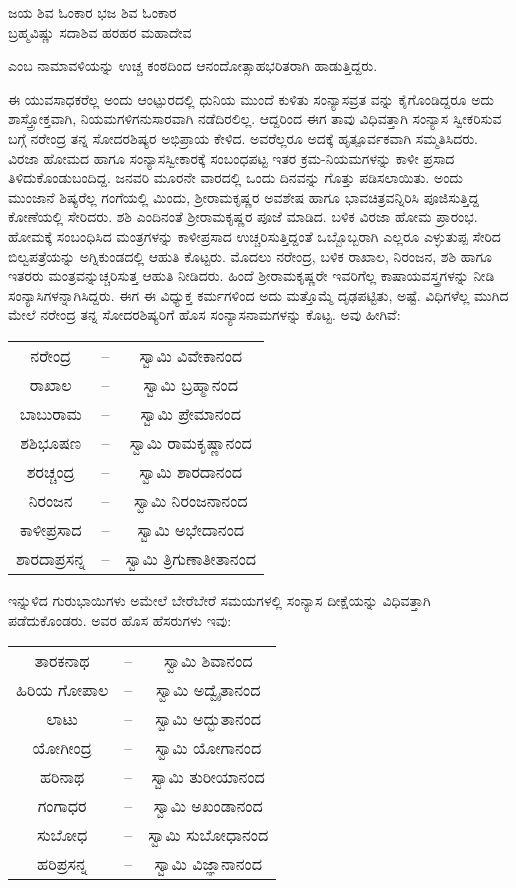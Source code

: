 \begin{myquote}
ಜಯ ಶಿವ ಓಂಕಾರ ಭಜ ಶಿವ ಓಂಕಾರ\\ಬ್ರಹ್ಮವಿಷ್ಣು ಸದಾಶಿವ ಹರಹರ ಮಹಾದೇವ
\end{myquote}

\noindent

ಎಂಬ ನಾಮಾವಳಿಯನ್ನು ಉಚ್ಚ ಕಂಠದಿಂದ ಆನಂದೋತ್ಸಾಹಭರಿತರಾಗಿ ಹಾಡುತ್ತಿದ್ದರು.

 ಈ ಯುವಸಾಧಕರೆಲ್ಲ ಅಂದು ಆಂಟ್ಪುರದಲ್ಲಿ ಧುನಿಯ ಮುಂದೆ ಕುಳಿತು ಸಂನ್ಯಾಸವ್ರತ ವನ್ನು ಕೈಗೊಂಡಿದ್ದರೂ ಅದು ಶಾಸ್ತ್ರೋಕ್ತವಾಗಿ, ನಿಯಮಗಳಿಗನುಸಾರವಾಗಿ ನಡೆದಿರಲಿಲ್ಲ. ಆದ್ದರಿಂದ ಈಗ ತಾವು ವಿಧಿವತ್ತಾಗಿ ಸಂನ್ಯಾಸ ಸ್ವೀಕರಿಸುವ ಬಗ್ಗೆ ನರೇಂದ್ರ ತನ್ನ ಸೋದರಶಿಷ್ಯರ ಅಭಿಪ್ರಾಯ ಕೇಳಿದ. ಅವರೆಲ್ಲರೂ ಅದಕ್ಕೆ ಹೃತ್ಪೂರ್ವಕವಾಗಿ ಸಮ್ಮತಿಸಿದರು. ವಿರಜಾ ಹೋಮದ ಹಾಗೂ ಸಂನ್ಯಾಸಸ್ವೀಕಾರಕ್ಕೆ ಸಂಬಂಧಪಟ್ಟ ಇತರ ಕ್ರಮ-ನಿಯಮಗಳನ್ನು ಕಾಳೀ ಪ್ರಸಾದ ತಿಳಿದುಕೊಂಡುಬಂದಿದ್ದ. ಜನವರಿ ಮೂರನೇ ವಾರದಲ್ಲಿ ಒಂದು ದಿನವನ್ನು ಗೊತ್ತು ಪಡಿಸಲಾಯಿತು. ಅಂದು ಮುಂಜಾನೆ ಶಿಷ್ಯರೆಲ್ಲ ಗಂಗೆಯಲ್ಲಿ ಮಿಂದು, ಶ್ರೀರಾಮಕೃಷ್ಣರ ಅವಶೇಷ ಹಾಗೂ ಭಾವಚಿತ್ರವನ್ನಿರಿಸಿ ಪೂಜಿಸುತ್ತಿದ್ದ ಕೋಣೆಯಲ್ಲಿ ಸೇರಿದರು. ಶಶಿ ಎಂದಿನಂತೆ ಶ್ರೀರಾಮಕೃಷ್ಣರ ಪೂಜೆ ಮಾಡಿದ. ಬಳಿಕ ವಿರಜಾ ಹೋಮ ಪ್ರಾರಂಭ. ಹೋಮಕ್ಕೆ ಸಂಬಂಧಿಸಿದ ಮಂತ್ರಗಳನ್ನು ಕಾಳೀಪ್ರಸಾದ ಉಚ್ಚರಿಸುತ್ತಿದ್ದಂತೆ ಒಬ್ಬೊಬ್ಬರಾಗಿ ಎಲ್ಲರೂ ಎಳ್ಳುತುಪ್ಪ ಸೇರಿದ ಬಿಲ್ವಪತ್ರೆಯನ್ನು ಅಗ್ನಿಕುಂಡದಲ್ಲಿ ಆಹುತಿ ಕೊಟ್ಟರು. ಮೊದಲು ನರೇಂದ್ರ, ಬಳಿಕ ರಾಖಾಲ, ನಿರಂಜನ, ಶಶಿ ಹಾಗೂ ಇತರರು ಮಂತ್ರವನ್ನುಚ್ಚರಿಸುತ್ತ ಆಹುತಿ ನೀಡಿದರು. ಹಿಂದೆ ಶ್ರೀರಾಮಕೃಷ್ಣರೇ ಇವರಿಗೆಲ್ಲ ಕಾಷಾಯವಸ್ತ್ರಗಳನ್ನು ನೀಡಿ ಸಂನ್ಯಾಸಿಗಳನ್ನಾಗಿಸಿದ್ದರು. ಈಗ ಈ ವಿಧ್ಯುಕ್ತ ಕರ್ಮಗಳಿಂದ ಅದು ಮತ್ತೊಮ್ಮೆ ದೃಢಪಟ್ಟಿತು, ಅಷ್ಟೆ. ವಿಧಿಗಳೆಲ್ಲ ಮುಗಿದ ಮೇಲೆ ನರೇಂದ್ರ ತನ್ನ ಸೋದರಶಿಷ್ಯರಿಗೆ ಹೊಸ ಸಂನ್ಯಾಸನಾಮಗಳನ್ನು ಕೊಟ್ಟ. ಅವು ಹೀಗಿವೆ:

\begin{tabular}{@{}ccc@{}}
ನರೇಂದ್ರ & – & ಸ್ವಾಮಿ ವಿವೇಕಾನಂದ \\
ರಾಖಾಲ & – & ಸ್ವಾಮಿ ಬ್ರಹ್ಮಾನಂದ \\
ಬಾಬುರಾಮ & – & ಸ್ವಾಮಿ ಪ್ರೇಮಾನಂದ \\
ಶಶಿಭೂಷಣ & – & ಸ್ವಾಮಿ ರಾಮಕೃಷ್ಣಾನಂದ \\
ಶರಚ್ಚಂದ್ರ & – & ಸ್ವಾಮಿ ಶಾರದಾನಂದ \\
ನಿರಂಜನ & – & ಸ್ವಾಮಿ ನಿರಂಜನಾನಂದ \\
ಕಾಳೀಪ್ರಸಾದ & – & ಸ್ವಾಮಿ ಅಭೇದಾನಂದ \\
ಶಾರದಾಪ್ರಸನ್ನ & – & ಸ್ವಾಮಿ ತ್ರಿಗುಣಾತೀತಾನಂದ \\
\end{tabular}

ಇನ್ನುಳಿದ ಗುರುಭಾಯಿಗಳು ಅಮೇಲೆ ಬೇರೆಬೇರೆ ಸಮಯಗಳಲ್ಲಿ ಸಂನ್ಯಾಸ ದೀಕ್ಷೆಯನ್ನು ವಿಧಿವತ್ತಾಗಿ ಪಡೆದುಕೊಂಡರು. ಅವರ ಹೊಸ ಹೆಸರುಗಳು ಇವು:

\begin{tabular}{@{}ccc@{}}
ತಾರಕನಾಥ & – & ಸ್ವಾಮಿ ಶಿವಾನಂದ \\
ಹಿರಿಯ ಗೋಪಾಲ & – & ಸ್ವಾಮಿ ಅದ್ವೈತಾನಂದ \\
ಲಾಟು & – & ಸ್ವಾಮಿ ಅದ್ಭುತಾನಂದ \\
ಯೋಗೀಂದ್ರ & – & ಸ್ವಾಮಿ ಯೋಗಾನಂದ \\
ಹರಿನಾಥ & – & ಸ್ವಾಮಿ ತುರೀಯಾನಂದ \\
ಗಂಗಾಧರ & – & ಸ್ವಾಮಿ ಅಖಂಡಾನಂದ \\
ಸುಬೋಧ & – & ಸ್ವಾಮಿ ಸುಬೋಧಾನಂದ \\
ಹರಿಪ್ರಸನ್ನ & – & ಸ್ವಾಮಿ ವಿಜ್ಞಾನಾನಂದ \\
\end{tabular}

